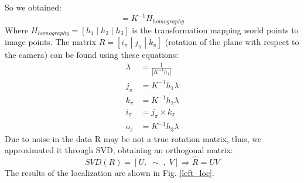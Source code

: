 \documentclass[11pt, oneside]{article}
\begin{document}
So we obtained:
\begin{equation}
	[j_\pi | k_\pi | o_\pi]= K^{-1}H_{homography} 
\end{equation}
Where $H_{homography} = [h_1\; |\; h_2\; |\; h_3]$ is the transformation mapping world points to image points. The matrix $R=[i_\pi\; | \; j_\pi \; | \; k_\pi]$ (rotation of the plane with respect to the camera) can be found using these equations:
\begin{subequations}
	\begin{align*}
		\lambda &= \frac{1}{|K^{-1}h_1|} \\
		j_\pi &= K^{-1}h_1\lambda \\
		k_\pi &= K^{-1}h_2\lambda \\
		i_\pi &= j_\pi \times k_\pi  \\
		o_\pi &= K^{-1} h_3 \lambda
	\end{align*}
\end{subequations}
Due to noise in the data R may be not a true rotation matrix, thus, we approximated it through SVD, obtaining an orthogonal matrix:
\begin{equation}
	SVD(R) = [U,\; \sim\;,\;V] \Rightarrow \hat{R} = UV
\end{equation}
The results of the localization are shown in Fig. \ref{left_loc}.
\end{document}
